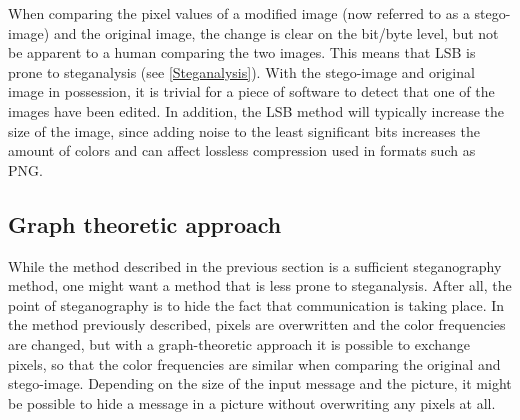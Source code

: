 When comparing the pixel values of a modified image (now referred to as a stego-image) and the original image, the change is clear on the bit/byte level, but not be apparent to a human comparing the two images. This means that LSB is prone to steganalysis (see \autoref{Steganalysis}). With the stego-image and original image in possession, it is trivial for a piece of software to detect that one of the images have been edited. In addition, the LSB method will typically increase the size of the image, since adding noise to the least significant bits increases the amount of colors and can affect lossless compression used in formats such as PNG.

\subsection{Graph theoretic approach}
While the method described in the previous section is a sufficient steganography method, one might want a method that is less prone to steganalysis. After all, the point of steganography is to hide the fact that communication is taking place. In the method previously described, pixels are overwritten and the color frequencies are changed, but with a graph-theoretic approach it is possible to exchange pixels, so that the color frequencies are similar when comparing the original and stego-image. Depending on the size of the input message and the picture, it might be possible to hide a message in a picture without overwriting any pixels at all.